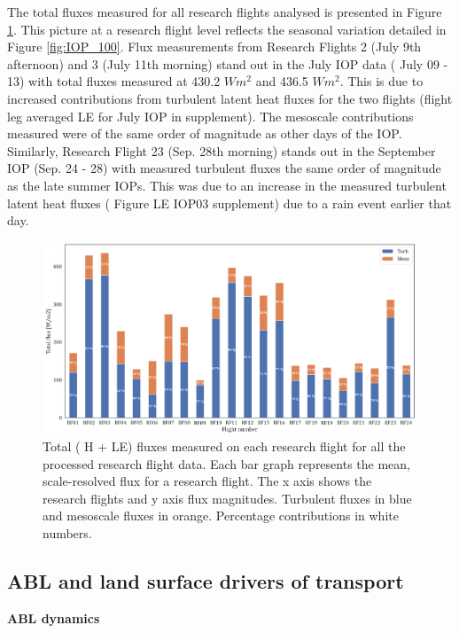 \documentclass[draft]{agujournal2019}
\begin{document}
The total fluxes measured for all research flights analysed is presented in Figure \ref{fig:flight_100}. This picture at a research flight level reflects the seasonal variation detailed in Figure \ref{fig:IOP_100}. Flux measurements from Research Flights 2 (July 9th afternoon) and 3 (July 11th morning) stand out in the July IOP data ( July 09 - 13) with total fluxes measured at 430.2 $W m^{2}$ and 436.5 $W m^{2}$. This is due to increased contributions from turbulent latent heat fluxes for the two flights (flight leg averaged LE for July IOP in supplement).  The mesoscale contributions measured were of the same order of magnitude as other days of the IOP. Similarly, Research Flight 23 (Sep. 28th morning) stands out in the September IOP (Sep. 24 - 28) with measured turbulent fluxes the same order of magnitude as the late summer IOPs. This was due to an increase in the measured turbulent latent heat fluxes ( Figure LE IOP03 supplement) due to a rain event earlier that day.
\begin{figure}[hbtp]
 \noindent\includegraphics[width=\textwidth]{flight_100.png}
\caption{Total ( H + LE) fluxes measured on each research flight for all the processed research flight data. Each bar graph represents the mean, scale-resolved flux for a research flight. The x axis shows the research flights and y axis flux magnitudes. Turbulent fluxes in blue and mesoscale fluxes in orange. Percentage contributions in white numbers.}
\label{fig:flight_100}
\end{figure}

\newpage

\subsection{ABL and land surface drivers of transport}

\textbf{ABL dynamics}
\end{document}
